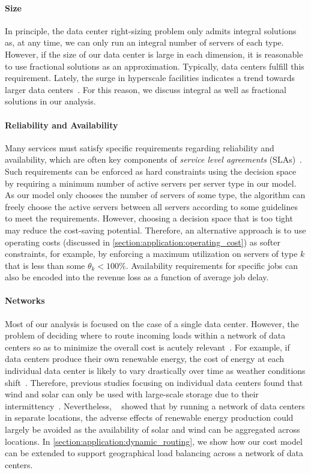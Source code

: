 \paragraph{Size} In principle, the data center right-sizing problem only admits integral solutions as, at any time, we can only run an integral number of servers of each type. However, if the size of our data center is large in each dimension, it is reasonable to use fractional solutions as an approximation. Typically, data centers fulfill this requirement. Lately, the surge in hyperscale facilities indicates a trend towards larger data centers~\cite{Jones2018}. For this reason, we discuss integral as well as fractional solutions in our analysis.

\paragraph{Reliability and Availability} Many services must satisfy specific requirements regarding reliability and availability, which are often key components of \emph{service level agreements} (SLAs)~\cite{Lin2011}. Such requirements can be enforced as hard constraints using the decision space by requiring a minimum number of active servers per server type in our model. As our model only chooses the number of servers of some type, the algorithm can freely choose the active servers between all servers according to some guidelines to meet the requirements. However, choosing a decision space that is too tight may reduce the cost-saving potential. Therefore, an alternative approach is to use operating costs (discussed in \cref{section:application:operating_cost}) as softer constraints, for example, by enforcing a maximum utilization on servers of type $k$ that is less than some $\theta_k < 100\%$. Availability requirements for specific jobs can also be encoded into the revenue loss as a function of average job delay.

\paragraph{Networks} Most of our analysis is focused on the case of a single data center. However, the problem of deciding where to route incoming loads within a network of data centers so as to minimize the overall cost is acutely relevant~\cite{Miller2021}. For example, if data centers produce their own renewable energy, the cost of energy at each individual data center is likely to vary drastically over time as weather conditions shift~\cite{Lin2012}. Therefore, previous studies focusing on individual data centers found that wind and solar can only be used with large-scale storage due to their intermittency~\cite{Gmach2010, Gmach2010_2}. Nevertheless, \citeauthor{Lin2012}~\cite{Lin2012} showed that by running a network of data centers in separate locations, the adverse effects of renewable energy production could largely be avoided as the availability of solar and wind can be aggregated across locations. In \cref{section:application:dynamic_routing}, we show how our cost model can be extended to support geographical load balancing across a network of data centers.

